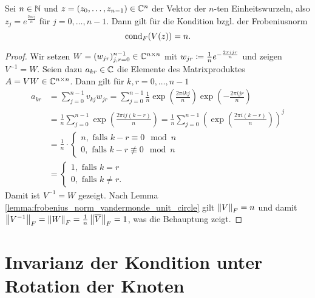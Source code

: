 \begin{lemma}
    Sei $n \in \N$ und $z = (z_0, \dots, z_{n-1}) \in \Cn$ der Vektor der
    $n$-ten Einheitswurzeln, also $z_j = e^{\frac{2 \pi i j}{n}}$ für
    $j = 0, \dots, n-1$.
    Dann gilt für die Kondition bzgl. der Frobeniusnorm
    \[
        \cond[F]{\Vand{z}} = n.
    \]
\end{lemma}
\begin{proof}
    Wir setzen $W = (w_{jr})_{j,r=0}^{n-1} \in \C^{n\times n}$ mit
    $w_{jr} \defeq \frac{1}{n} e^{- \frac{2 \pi i j r}{n}}$
    und zeigen $V^{-1} = W$.
    Seien dazu $a_{kr} \in \C$ die Elemente des Matrixproduktes
    $A = V W \in \C^{n\times n}$.
    Dann gilt für $k, r = 0, \dots, n-1$
    \[
        \begin{split}
            a_{kr}
            &= \sum_{j=0}^{n-1} v_{kj} w_{jr}
            = \sum_{j=0}^{n-1} \frac{1}{n} \exp \left( \frac{2 \pi i k j}{n} \right) \exp \left( -\frac{2 \pi i j r}{n} \right)\\
            &= \frac{1}{n} \sum_{j=0}^{n-1} \exp \left( \frac{2 \pi i j (k - r)}{n} \right)
            = \frac{1}{n} \sum_{j=0}^{n-1} \left( \exp \left( \frac{2 \pi i (k - r)}{n} \right) \right)^j\\
            &= \frac{1}{n} \cdot \left\{
                \begin{array}{ll}
                    n, \text{ falls } k-r \equiv 0 \mod n\\
                    0, \text{ falls } k-r \not\equiv 0 \mod n
                \end{array}
              \right.\\
            &= \left\{
                \begin{array}{ll}
                    1, \text{ falls } k = r \\
                    0, \text{ falls } k \neq r .
                \end{array}
              \right.
        \end{split}
    \]
    Damit ist $V^{-1} = W$ gezeigt.
    Nach Lemma \ref{lemma:frobenius_norm_vandermonde_unit_circle} gilt $\norm{V}_F = n$
    und damit $\norm{V^{-1}}_F = \norm{W}_F = \frac{1}{n} \norm{\overline V}_F = 1$,
    was die Behauptung zeigt.
\end{proof}


\section{Invarianz der Kondition unter Rotation der Knoten}

